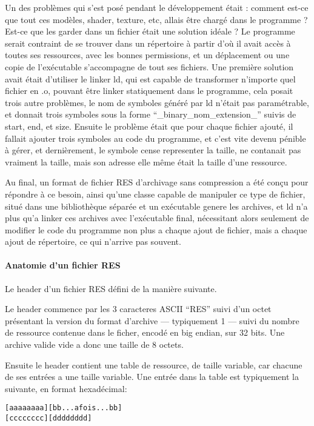 \documentclass[11pt, a4paper, titlepage]{article}
\begin{document}
Un des problèmes qui s'est posé pendant le développement était : comment est-ce que tout ces modèles, shader, texture, etc, allais être chargé dans le programme ?
Est-ce que les garder dans un fichier était une solution idéale ? Le programme serait contraint de se trouver dans un répertoire à partir d'où il avait accès 
à toutes ses ressources, avec les bonnes permissions, et un déplacement ou une copie de l'exécutable s'accompagne de tout ses fichiers.
Une première solution avait était d'utiliser le linker ld, qui est capable de transformer n'importe quel fichier en .o, pouvant être linker statiquement dans
 le programme, cela posait trois autre problèmes, le nom de symboles généré par ld n'était pas paramétrable, et donnait trois symboles sous la forme
 ``\_binary\_nom\_extension\_'' suivis de start, end, et size. Ensuite le problème était que pour chaque fichier ajouté, il fallait ajouter trois symboles au code du 
programme, et c'est vite devenu pénible à gérer, et dernièrement, le symbole cense representer la taille, ne contanait pas vraiment la taille, mais son adresse 
elle même était la taille d'une ressource.

Au final, un format de fichier RES d'archivage sans compression a été conçu pour répondre à ce besoin, ainsi qu'une classe capable de manipuler ce type
 de fichier, situé dans une bibliothèque séparée et un exécutable genere les archives, et ld n'a plus qu'a linker ces archives avec l'exécutable final, 
nécessitant alors seulement de modifier le code du programme non plus a chaque ajout de fichier, mais a chaque ajout de répertoire, ce qui n'arrive pas souvent.

\paragraph{Anatomie d'un fichier RES}

Le header d'un fichier RES défini de la manière suivante.

Le header commence par les 3 caracteres ASCII ``RES'' suivi d'un octet présentant la version du format d'archive --- typiquement 1 --- suivi du nombre de
ressource contenue dans le ficher, encodé en big endian, sur 32 bits.
Une archive valide vide a donc une taille de 8 octets.

Ensuite le header contient une table de ressource, de taille variable, car chacune de ses entrées a une taille variable.
Une entrée dans la table est typiquement la suivante, en format hexadécimal:

\begin{alltt}
[ aa aa aa aa ] [ bb {... a fois ...} bb]
[ cc cc cc cc ] [ dd dd dd dd ]
\end{alltt}
\end{document}
